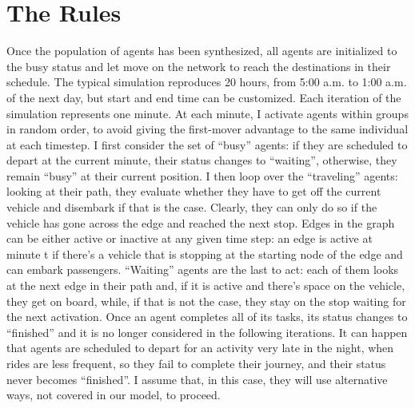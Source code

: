 \section{The Rules}\label{sec:3.4}

Once the population of agents has been synthesized, all agents are initialized to the busy status and let move on the network to reach the destinations in their schedule. 
The typical simulation reproduces 20 hours, from 5:00 a.m. to 1:00 a.m. of the next day, but start and end time can be customized.
Each iteration of the simulation represents one minute. At each minute, I activate agents within groups in random order, to avoid giving the first-mover advantage to the same individual at each timestep. I first consider the set of “busy” agents: if they are scheduled to depart at the current minute, their status changes to “waiting”, otherwise, they remain “busy” at their current position. I then loop over the “traveling” agents: looking at their path, they evaluate whether they have to get off the current vehicle and disembark if that is the case. Clearly, they can only do so if the vehicle has gone across the edge and reached the next stop. Edges in the graph can be either active or inactive at any given time step: an edge is active at minute t if there’s a vehicle that is stopping at the starting node of the edge and can embark passengers. “Waiting” agents are the last to act: each of them looks at the next edge in their path and, if it is active and there’s space on the vehicle, they get on board, while, if that is not the case, they stay on the stop waiting for the next activation. Once an agent completes all of its tasks, its status changes to “finished” and it is no longer considered in the following iterations. It can happen that agents are scheduled to depart for an activity very late in the night, when rides are less frequent, so they fail to complete their journey, and their status never becomes “finished”. I assume that, in this case, they will use alternative ways, not covered in our model, to proceed. 


